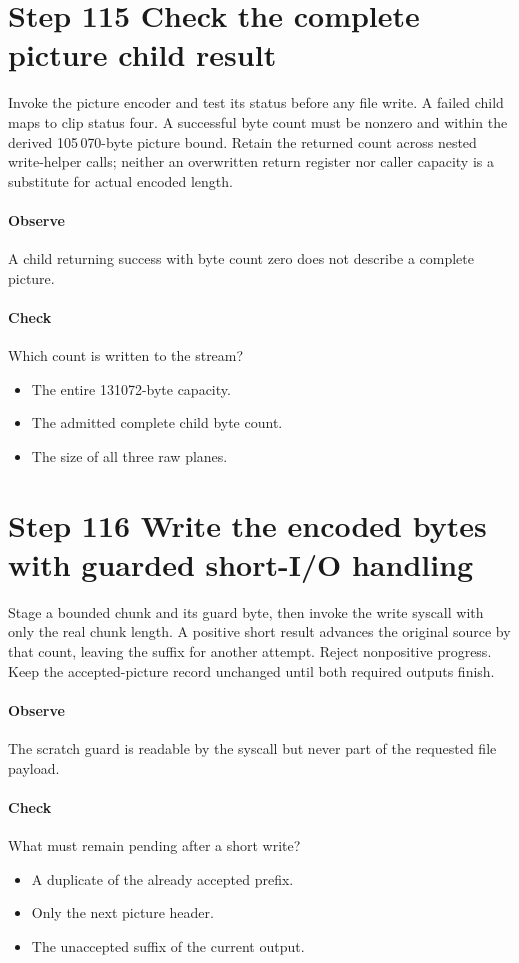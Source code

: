 \section{Step 115 Check the complete picture child result}\label{h263-clip-s05}
Invoke the picture encoder and test its status before any file write. A failed
child maps to clip status four. A successful byte count must be nonzero and within
the derived 105\,070-byte picture bound. Retain the returned count across nested
write-helper calls; neither an overwritten return register nor caller capacity
is a substitute for actual encoded length.

\paragraph{Observe} A child returning success with byte count zero does not describe a complete picture.
\paragraph{Check} Which count is written to the stream?
\begin{itemize}
  \item[A.] The entire 131072-byte capacity.
  \item[B.] The admitted complete child byte count.
  \item[C.] The size of all three raw planes.
\end{itemize}

\section{Step 116 Write the encoded bytes with guarded short-I/O handling}\label{h263-clip-s06}
Stage a bounded chunk and its guard byte, then invoke the write syscall with only
the real chunk length. A positive short result advances the original source by
that count, leaving the suffix for another attempt. Reject nonpositive progress.
Keep the accepted-picture record unchanged until both required outputs finish.

\paragraph{Observe} The scratch guard is readable by the syscall but never part of the requested file payload.
\paragraph{Check} What must remain pending after a short write?
\begin{itemize}
  \item[A.] A duplicate of the already accepted prefix.
  \item[B.] Only the next picture header.
  \item[C.] The unaccepted suffix of the current output.
\end{itemize}

